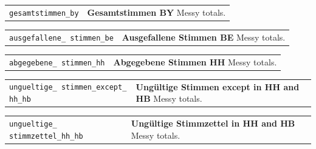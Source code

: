\documentclass[
]{article}
\begin{document}
\begin{longtable}{p{3.2cm}| p{11cm}}
\texttt{gesamtstimmen\_by} &\textbf{Gesamtstimmen BY}\newline 
Messy totals.
\end{longtable}

\begin{longtable}{p{3.2cm}| p{11cm}}
\texttt{ausgefallene\_
stimmen\_be} &\textbf{Ausgefallene Stimmen BE}\newline 
Messy totals.
\end{longtable}

\begin{longtable}{p{3.2cm}| p{11cm}}
\texttt{abgegebene\_
stimmen\_hh} &\textbf{Abgegebene Stimmen HH}\newline 
Messy totals.
\end{longtable}

\begin{longtable}{p{3.2cm}| p{11cm}}
\texttt{ungueltige\_
stimmen\_except\_
hh\_hb} &\textbf{Ungültige Stimmen except in HH and HB}\newline 
Messy totals.
\end{longtable}

\begin{longtable}{p{3.2cm}| p{11cm}}
\texttt{ungueltige\_
stimmzettel\_hh\_hb} &\textbf{Ungültige Stimmzettel in HH and HB}\newline 
Messy totals.
\end{longtable}
\end{document}
